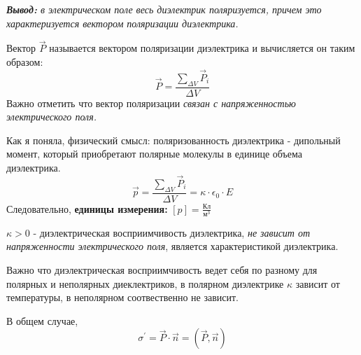 \documentclass[../main.tex]{subfiles}
\begin{document}
\vspace{5px}

\textit{\textbf{Вывод:} в электрическом поле весь диэлектрик поляризуется, причем это характеризуется вектором поляризации диэлектрика.}

\vspace{5px}

 Вектор $\vec P$ называется вектором поляризации диэлектрика и вычисляется он таким образом:
\[ \vec P = \frac{\sum_{\Delta V} \vec P_i}{\Delta V}\]
Важно отметить что вектор поляризации \textit{связан с напряженностью электрического поля.}

Как я поняла, физический смысл: поляризованность диэлектрика - дипольный момент, который приобретают полярные молекулы в единице объема диэлектрика.
\[ \vec p  = \frac{\sum_{\Delta V} \vec P_i}{\Delta V} = \kappa \cdot \epsilon_0 \cdot E\]
Следовательно, \textbf{единицы измерения:} $[p] = \frac{\text{Кл}}{\text{м}^3}$

\vspace{5px}

$\kappa > 0$ - диэлектрическая восприимчивость диэлектрика, \textit{не зависит от напряженности электрического поля}, является характеристикой диэлектрика.

\vspace{5px}

Важно что диэлектрическая восприимчивость ведет себя по разному для полярных и неполярных диеклектриков, в полярном диэлектрике $\kappa$ зависит от температуры, в неполярном соотвественно не зависит.

В общем случае, \[ \sigma^\prime = \vec P \cdot \vec n = (\vec P, \vec n) \]
\end{document}
